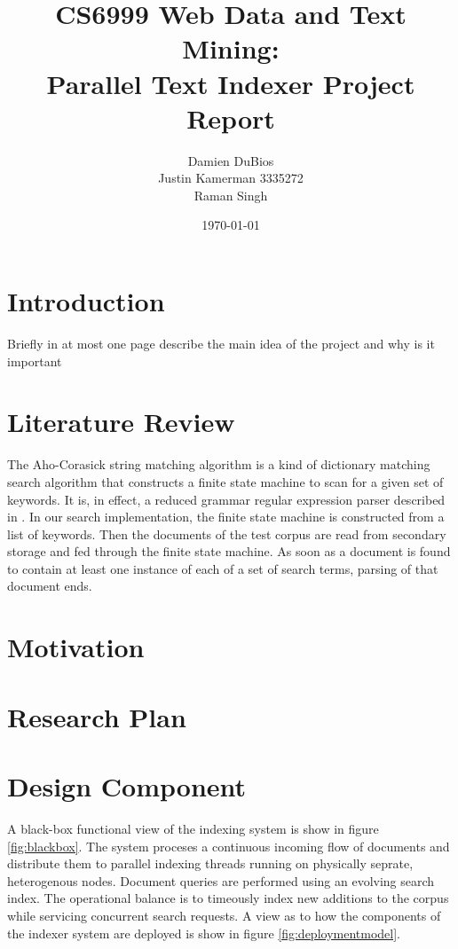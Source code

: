 \documentclass[10pt]{report}
\title{CS6999 Web Data and Text Mining:\\Parallel Text Indexer Project Report}
\author{Damien DuBios\\Justin Kamerman 3335272\\Raman Singh}
\date{\today}
\begin{document}
\maketitle
\renewcommand*\thesection{\arabic{section}}

\section{Introduction}
Briefly in at most one page describe the main idea of the project and why is it important\\

\section{Literature Review}
\label{sec:literaturereview}
The Aho-Corasick string matching algorithm\cite{RefWorks:103} is a
kind of dictionary matching search algorithm that constructs a finite
state machine to scan for a given set of keywords. It is, in effect, a
reduced grammar regular expression parser described in
\cite{RefWorks:111}. In our search implementation, the finite state
machine is constructed from a list of keywords. Then the documents
of the test corpus are read from secondary storage and fed through the
finite state machine. As soon as a document is found to contain at
least one instance of each of a set of search terms, parsing of that document
ends.


\section{Motivation}
\label{sec:motivation}


\section{Research Plan}
\label{sec:researchplan}


\section{Design Component}
\label{sec:designcomponent}
A black-box functional view of the indexing system is show in figure
\ref{fig:blackbox}. The system proceses a continuous incoming flow of
documents and distribute them to parallel indexing threads running on
physically seprate, heterogenous nodes.  Document queries are performed
using an evolving search index. The operational balance is to
timeously index new additions to the corpus while servicing concurrent
search requests. A view as to how the components of the indexer system
are deployed is show in figure \ref{fig:deploymentmodel}.
\end{document}
